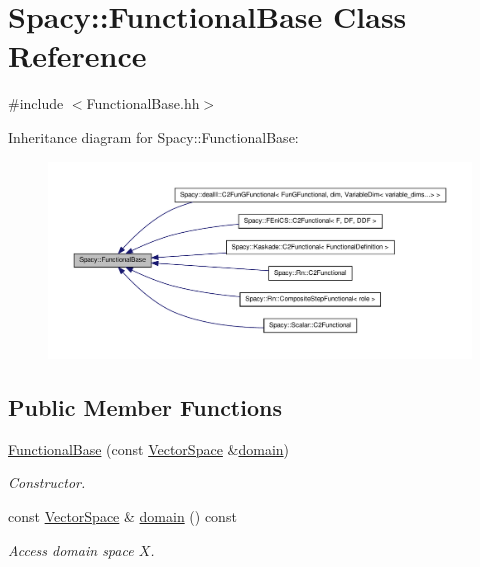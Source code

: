 \hypertarget{classSpacy_1_1FunctionalBase}{\section{\-Spacy\-:\-:\-Functional\-Base \-Class \-Reference}
\label{classSpacy_1_1FunctionalBase}
}


{\ttfamily \#include $<$\-Functional\-Base.\-hh$>$}



\-Inheritance diagram for \-Spacy\-:\-:\-Functional\-Base\-:
\nopagebreak
\begin{figure}[H]
\begin{center}
\leavevmode
\includegraphics[width=350pt]{classSpacy_1_1FunctionalBase__inherit__graph}
\end{center}
\end{figure}
\subsection*{\-Public \-Member \-Functions}
\begin{DoxyCompactItemize}
\item 
\hyperlink{classSpacy_1_1FunctionalBase_aa655b0f2b96f02a3137dad89e3f0d2ac}{\-Functional\-Base} (const \hyperlink{classSpacy_1_1VectorSpace}{\-Vector\-Space} \&\hyperlink{classSpacy_1_1FunctionalBase_a2d3397deb9fa1ad85ed04e37a03b3aa6}{domain})
\begin{DoxyCompactList}\small\item\em \-Constructor. \end{DoxyCompactList}\item 
\hypertarget{classSpacy_1_1FunctionalBase_a2d3397deb9fa1ad85ed04e37a03b3aa6}{const \hyperlink{classSpacy_1_1VectorSpace}{\-Vector\-Space} \& \hyperlink{classSpacy_1_1FunctionalBase_a2d3397deb9fa1ad85ed04e37a03b3aa6}{domain} () const }\label{classSpacy_1_1FunctionalBase_a2d3397deb9fa1ad85ed04e37a03b3aa6}

\begin{DoxyCompactList}\small\item\em \-Access domain space $X$. \end{DoxyCompactList}\end{DoxyCompactItemize}


